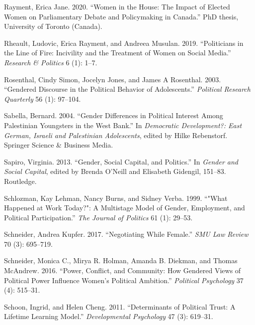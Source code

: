 \documentclass[
  letterpaper,
  DIV=11,
  numbers=noendperiod]{scrreprt}
\newlength{\cslhangindent}
\newlength{\cslentryspacingunit} %
\newenvironment{CSLReferences}[2] %
 {%
  \setlength{\parindent}{0pt}
  \ifodd #1
  \let\oldpar\par
  \def\par{\hangindent=\cslhangindent\oldpar}
  \fi
  \setlength{\parskip}{#2\cslentryspacingunit}
 }%
 {}
\begin{document}
\begin{CSLReferences}{1}{0}
\leavevmode{}%
Rayment, Erica Jane. 2020. {``{Women in the House: The Impact of Elected
Women on Parliamentary Debate and Policymaking in Canada}.''} PhD
thesis, University of Toronto (Canada).

\leavevmode{}%
Rheault, Ludovic, Erica Rayment, and Andreea Musulan. 2019.
{``{Politicians in the Line of Fire: Incivility and the Treatment of
Women on Social Media}.''} \emph{Research \& Politics} 6 (1): 1--7.

\leavevmode{}%
Rosenthal, Cindy Simon, Jocelyn Jones, and James A Rosenthal. 2003.
{``{Gendered Discourse in the Political Behavior of Adolescents}.''}
\emph{Political Research Quarterly} 56 (1): 97--104.

\leavevmode{}%
Sabella, Bernard. 2004. {``{Gender Differences in Political Interest
Among Palestinian Youngsters in the West Bank}.''} In \emph{{Democratic
Development?: East German, Israeli and Palestinian Adolescents}}, edited
by Hilke Rebenstorf. Springer Science \& Business Media.

\leavevmode{}%
Sapiro, Virginia. 2013. {``{Gender, Social Capital, and Politics}.''} In
\emph{{Gender and Social Capital}}, edited by Brenda O'Neill and
Elisabeth Gidengil, 151--83. Routledge.

\leavevmode{}%
Schlozman, Kay Lehman, Nancy Burns, and Sidney Verba. 1999. {``{"What
Happened at Work Today?": A Multistage Model of Gender, Employment, and
Political Participation}.''} \emph{The Journal of Politics} 61 (1):
29--53.

\leavevmode{}%
Schneider, Andrea Kupfer. 2017. {``{Negotiating While Female}.''}
\emph{SMU Law Review} 70 (3): 695--719.

\leavevmode{}%
Schneider, Monica C., Mirya R. Holman, Amanda B. Diekman, and Thomas
McAndrew. 2016. {``{Power, Conflict, and Community: How Gendered Views
of Political Power Influence Women's Political Ambition}.''}
\emph{Political Psychology} 37 (4): 515--31.

\leavevmode{}%
Schoon, Ingrid, and Helen Cheng. 2011. {``{Determinants of Political
Trust: A Lifetime Learning Model}.''} \emph{Developmental Psychology} 47
(3): 619--31.


\end{CSLReferences}
\end{document}
